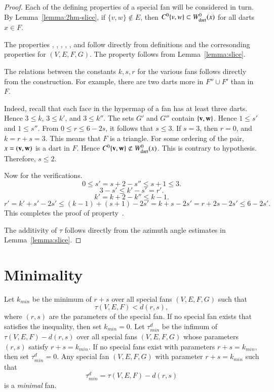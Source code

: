\begin{proof}  Each of the defining properties of a special fan will be considered in turn.  By Lemma~\ref{lemma:2hm-slice}, if $\{v,w\}\not\in E$, then $C^0\{v,w\}\subset W^0_{\text{dart}}(x)$ for all darts $x\in F$.

The properties , , , , , and  follow directly from definitions and the corresonding properties for $(V,E,F,G)$.
The property  follows from Lemma~\ref{lemma:slice}.

The relations between the constants $k,s,r$ for the various fans follows directly from the construction.
For example, there are two darts more in $F''\cup F'$ than in $F$.  

  Indeed, recall that each face in the hypermap of a fan has at least three darts.  Hence $3\le k$, $3\le k'$, and $3\le k''$.
The sets $G'$ and $G''$ contain $\{{\mathbf v},{\mathbf w}\}$.  Hence $1\le s'$ and $1\le s''$.
From $0\le r\le 6 - 2s$, it follows that $s\le 3$.  If $s=3$, then $r=0$, and $k=r+s=3$.  This means that $F$ is a triangle.  For some ordering of the pair, $x=({\mathbf v},{\mathbf w})$ is a dart in $F$.
Hence  $C^0\{{\mathbf v},{\mathbf w}\} \not\subset W^0_{\text{dart}}(x)$.  This is contrary to hypothesis.  Therefore, $s\le 2$.

Now for the verifications.
$$0\le s' = s + 2 - s'' \le s+1\le 3.$$
$$3-s'\le k'-s' = r'.$$
$$k' = k + 2 - k'' \le k-1.$$
$$
r'= k'+s' - 2 s' \le (k-1) + (s+1) - 2s' =k+s - 2s' = r + 2s -2s' \le 6 - 2s'.
$$
This completes the proof of property~.

The additivity of $\tau$ follows directly from the azimuth angle estimates in Lemma~\ref{lemma:slice}.
\end{proof}


\section{Minimality}



\begin{definition}
Let $k_{min}$ be the minimum of $r+s$ over
all special fans $(V,E,F,G)$ such that 
\begin{equation}\label{eqn:kmin}
\tau(V,E,F) < d (r,s),
\end{equation}
where $(r,s)$ are the parameters of the special fan.
If no special fan exists that satisfies the inequality, then set $k_{min}=0$.
Let $\tau^d_{min}$ be the infimum of $\tau(V,E,F)-d(r,s)$ over all special fans
$(V,E,F,G)$ whose parameters $(r,s)$ satisfy $r+s=k_{min}$.  If no special fans
exist with parameters $r+s=k_{min}$, then set $\tau^d_{min}=0$.
Any special fan $(V,E,F,G)$ with parameter $r+s=k_{min}$ such that
$$
\tau^d_{min}= \tau(V,E,F)-d(r,s)
$$
is a {\it minimal}  fan.
\end{definition}


